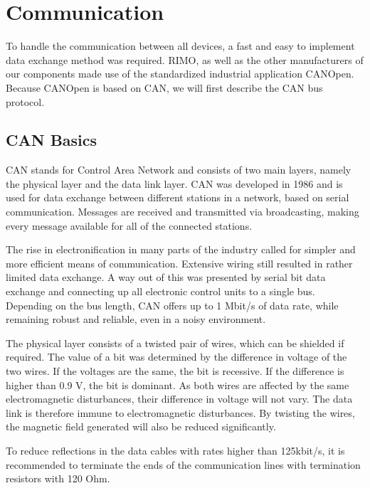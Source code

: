 
\chapter{Communication}
\label{chp:Communication}

To handle the communication between all devices, a fast and easy to implement data exchange method was required. RIMO, as well as the other manufacturers of our components made use of the standardized industrial application CANOpen. Because CANOpen is based on CAN, we will first describe the CAN bus protocol.

\section{CAN Basics}


CAN stands for Control Area Network and consists of two main layers, namely the physical layer and the data link layer. CAN was developed in 1986 and is used for data exchange between different stations in a network, based on serial communication. Messages are received and transmitted via broadcasting, making every message available for all of the connected stations. 

The rise in electronification in many parts of the industry called for simpler and more efficient means of communication. Extensive wiring still resulted in rather limited data exchange. A way out of this was presented by serial bit data exchange and connecting up all electronic control units to a single bus. Depending on the bus length, CAN offers up to 1 Mbit/s of data rate, while remaining robust and reliable, even in a noisy environment.

The physical layer consists of a twisted pair of wires, which can be shielded if required. The value of a bit was determined by the difference in voltage of the two wires. If the voltages are the same, the bit is recessive. If the difference is higher than 0.9 V, the bit is dominant. As both wires are affected by the same electromagnetic disturbances, their difference in voltage will not vary. The data link is therefore immune to electromagnetic disturbances. By twisting the wires, the magnetic field generated will also be reduced significantly.


To reduce reflections in the data cables with rates higher than 125kbit/s, it is recommended to terminate the ends of the communication lines with termination resistors with 120 Ohm. 

